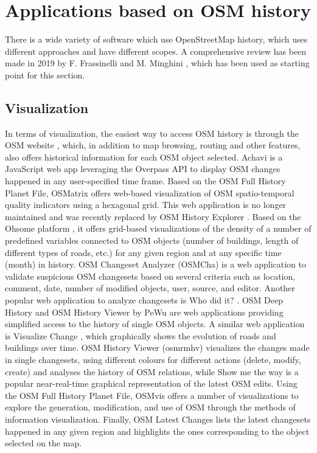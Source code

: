 \documentclass{Configuration_Files/PoliMi3i_thesis}
\begin{document}
\section{Applications based on OSM history}

There is a wide variety of software which use OpenStreetMap history, which uses different approaches and have different scopes. A comprehensive review has been made in 2019 by F. Frassinelli and M. Minghini \cite{minghiniOpenStreetMapHistoryIntrinsic2019}, which has been used as starting point for this section.

\subsection{Visualization}

In terms of visualization, the easiest way to access OSM history is through the OSM website \cite{OpenStreetMap}, which, in addition to map browsing, routing and other features, also offers historical information for each OSM object selected. Achavi \cite{AchaviAugmentedOSM, AchaviSourceCode} is a JavaScript web app leveraging the Overpass API to display OSM changes happened in any user-specified time frame. Based on the OSM Full History Planet File, OSMatrix \cite{roickOSMatrixGridbasedAnalysis2011} offers web-based visualization of OSM spatio-temporal quality indicators using a hexagonal grid. This web application is no longer maintained and was recently replaced by OSM History Explorer \cite{OhsomeHeXOSMHistory}. Based on the Ohsome platform \cite{OhsomeHeidelbergInstitute}, it offers grid-based visualizations of the density of a number of predefined variables connected to OSM objects (number of buildings, length of different types of roads, etc.) for any given region and at any specific time (month) in history. OSM Changeset Analyzer (OSMCha) \cite{OSMCha} is a web application to validate suspicious OSM changesets based on several criteria such as location, comment, date, number of modified objects, user, source, and editor. Another popular web application to analyze changesets is Who did it? \cite{WHODIDITOpenStreetMapChangeset}. OSM Deep History \cite{OSMDeepHistory2022} and OSM History Viewer by PeWu \cite{OSMHistoryViewer} are web applications providing simplified access to the history of single OSM objects. A similar web application is Visualize Change \cite{Visualizechange2022}, which graphically shows the evolution of roads and buildings over time. OSM History Viewer (osmrmhv) \cite{OsmrmhvOsmrmhv2022} visualizes the changes made in single changesets, using different colours for different actions (delete, modify, create) and analyses the history of OSM relations, while Show me the way \cite{OsmlabShowmethewaySee} is a popular near-real-time graphical representation of the latest OSM edits. Using the OSM Full History Planet File, OSMvis \cite{mocnikOSMvisOpenStreetMapVisualization2021, mocnikOpenSourceData2018} offers a number of visualizations to explore the generation, modification, and use of OSM through the methods of information visualization. Finally, OSM Latest Changes \cite{OSMLatestChanges2022} lists the latest changesets happened in any given region and highlights the ones corresponding to the object selected on the map.
\end{document}
